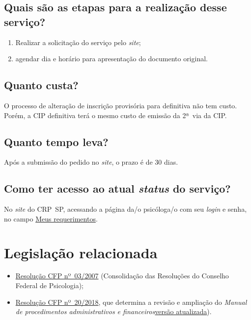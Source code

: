 \subsection{Quais são as etapas para a realização desse 	serviço?}

\begin{enumerate}
	\item
	Realizar a solicitação do serviço pelo \emph{site};
	\item
	agendar dia e horário para apresentação do documento original.
\end{enumerate}

\subsection{Quanto custa?}

O processo de alteração de inscrição provisória para definitiva não tem custo. Porém, a CIP definitiva terá o mesmo custo de emissão da 2ª~via da CIP.

\subsection{Quanto tempo leva?}

Após a submissão do pedido no \emph{site}, o prazo é de 30 dias.

\subsection{Como ter acesso ao atual \emph{status} do serviço?}

No \emph{site} do CRP~SP, acessando a página da/o psicóloga/o com seu \emph{login} e senha, no campo \href{https://cfpsp.brctotal.com/crp06_servicosonline/pgsRequerimento/MeusRequerimentos.aspx}{Meus requerimentos}.

\section{Legislação relacionada}

\begin{itemize}
	\item
	\href{https://atosoficiais.com.br/cfp/resolucao-administrativa-financeira-n-3-2007-institui-a-consolidacao-das-resolucoes-do-conselho-federal-de-psicologia}{Resolução CFP nº~03/2007} (Consolidação das Resoluções do Conselho Federal de Psicologia);
	\item
	\href{https://transparencia.cfp.org.br/wp-content/uploads/sites/7/2020/05/Manual-de-Procedimentos-Administrativos-e-Financeiro-CFP-RES-20.2018.pdf}{\href{https://atosoficiais.com.br/cfp/resolucao-administrativa-financeira-n-20-2018-altera-o-manual-de-procedimentos-administrativo-e-financeiro-do-sistema-conselhos-de-psicologia-anexo-da-resolucao-cfp-n-202018-a-resolucao-cfp-n-03-2007-a-resolucao-cfp-n-16-2019-e-da-outras-providencias}{Resolução CFP nº~20/2018}}, que determina a revisão e ampliação do \emph{Manual de procedimentos administrativos e financeiros}\href{https://transparencia.cfp.org.br/wp-content/uploads/sites/7/2020/05/Manual-de-Procedimentos-Administrativos-e-Financeiro-CFP-RES-20.2018.pdf}{versão
		atualizada}).
\end{itemize}

